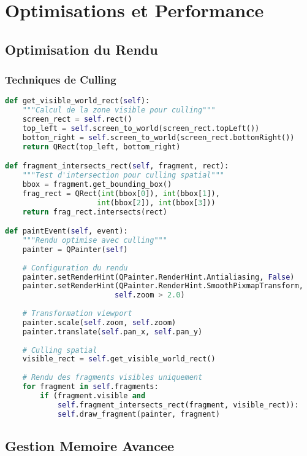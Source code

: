 \documentclass[12pt,a4paper]{article}
\begin{document}
\section{Optimisations et Performance}

\subsection{Optimisation du Rendu}

\subsubsection{Techniques de Culling}

\begin{lstlisting}[language=Python]
def get_visible_world_rect(self):
    """Calcul de la zone visible pour culling"""
    screen_rect = self.rect()
    top_left = self.screen_to_world(screen_rect.topLeft())
    bottom_right = self.screen_to_world(screen_rect.bottomRight())
    return QRect(top_left, bottom_right)

def fragment_intersects_rect(self, fragment, rect):
    """Test d'intersection pour culling spatial"""
    bbox = fragment.get_bounding_box()
    frag_rect = QRect(int(bbox[0]), int(bbox[1]), 
                     int(bbox[2]), int(bbox[3]))
    return frag_rect.intersects(rect)

def paintEvent(self, event):
    """Rendu optimise avec culling"""
    painter = QPainter(self)
    
    # Configuration du rendu
    painter.setRenderHint(QPainter.RenderHint.Antialiasing, False)
    painter.setRenderHint(QPainter.RenderHint.SmoothPixmapTransform, 
                         self.zoom > 2.0)
    
    # Transformation viewport
    painter.scale(self.zoom, self.zoom)
    painter.translate(self.pan_x, self.pan_y)
    
    # Culling spatial
    visible_rect = self.get_visible_world_rect()
    
    # Rendu des fragments visibles uniquement
    for fragment in self.fragments:
        if (fragment.visible and 
            self.fragment_intersects_rect(fragment, visible_rect)):
            self.draw_fragment(painter, fragment)
\end{lstlisting}

\subsection{Gestion Memoire Avancee}
\end{document}
